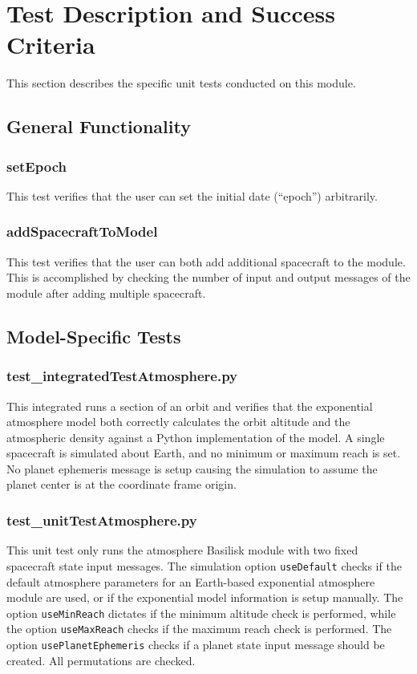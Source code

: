 
\section{Test Description and Success Criteria}
This section describes the specific unit tests conducted on this module.

\subsection{General Functionality}

\subsubsection{setEpoch}

This test verifies that the user can set the initial date (``epoch'') arbitrarily.

\subsubsection{addSpacecraftToModel}

This test verifies that the user can both add additional spacecraft to the module. This is accomplished by checking the number of input and output messages of the module after adding multiple spacecraft.

\subsection{Model-Specific Tests}

\subsubsection{test\_integratedTestAtmosphere.py}
This integrated runs a section of an orbit and verifies that the exponential atmosphere model both correctly calculates the orbit altitude and the atmospheric density against a Python implementation of the model.   A single spacecraft is simulated about Earth, and no minimum or maximum reach is set.  No planet ephemeris message is setup causing the simulation to assume the planet center is at the coordinate frame origin.

\subsubsection{test\_unitTestAtmosphere.py}
This unit test only runs the atmosphere Basilisk module with two fixed spacecraft state input messages.  The simulation option {\tt useDefault} checks if the default atmosphere parameters for an Earth-based exponential atmosphere module are used, or if the exponential model information is setup manually.  The option {\tt useMinReach} dictates if the minimum altitude check is performed, while the option {\tt useMaxReach} checks if the maximum reach check is performed.  The option {\tt usePlanetEphemeris} checks if a planet state input message should be created.  All permutations are checked.

